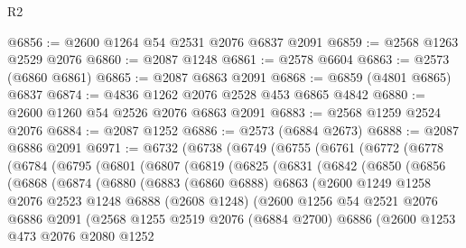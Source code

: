 \begin{lexlean}{R2}
\begin{coremodule}
@6856 := @2600 @1264 @54 @2531 @2076 @6837 @2091
@6859 := @2568 @1263 @2529 @2076
@6860 := @2087 @1248
@6861 := @2578 @6604
@6863 := @2573 (@6860 @6861)
@6865 := @2087 @6863 @2091
@6868 := @6859 (@4801 @6865) @6837
@6874 := @4836 @1262 @2076 @2528 @453 @6865 @4842
@6880 := @2600 @1260 @54 @2526 @2076 @6863 @2091
@6883 := @2568 @1259 @2524 @2076
@6884 := @2087 @1252
@6886 := @2573 (@6884 @2673)
@6888 := @2087 @6886 @2091
@6971 := @6732
    (@6738
      (@6749
        (@6755
          (@6761
            (@6772
              (@6778
                (@6784
                  (@6795
                    (@6801
                      (@6807
                        (@6819
                          (@6825
                            (@6831
                              (@6842
                                (@6850
                                  (@6856
                                    (@6868
                                      (@6874
                                        (@6880
                                          (@6883
                                            (@6860 @6888)
                                            @6863
                                            (@2600
                                              @1249
                                              @1258
                                              @2076
                                              @2523
                                              @1248
                                              @6888
                                              (@2608 @1248)
                                              (@2600
                                                @1256
                                                @54
                                                @2521
                                                @2076
                                                @6886
                                                @2091
                                                (@2568
                                                  @1255
                                                  @2519
                                                  @2076
                                                  (@6884 @2700)
                                                  @6886
                                                  (@2600
                                                    @1253
                                                    @473
                                                    @2076
                                                    @2080
                                                    @1252

\end{coremodule}
\end{lexlean}
